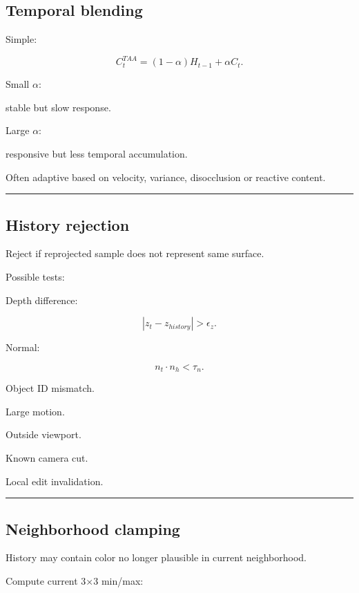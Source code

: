 \subsection{Temporal blending}\label{04-visual-computing-ii-ch040-temporal-blending}

Simple:

\[
\boxed{
C_t^{TAA}
=
(1-\alpha)
H_{t-1}
+
\alpha
C_t.
}
\]

Small \(\alpha\):

stable but slow response.

Large \(\alpha\):

responsive but less temporal accumulation.

Often adaptive based on velocity, variance, disocclusion or reactive content.

\begin{center}\rule{0.5\linewidth}{0.5pt}\end{center}

\subsection{History rejection}\label{04-visual-computing-ii-ch040-history-rejection}

Reject if reprojected sample does not represent same surface.

Possible tests:

Depth difference:

\[
|z_t-z_{history}|>\epsilon_z.
\]

Normal:

\[
n_t\cdot n_h<\tau_n.
\]

Object ID mismatch.

Large motion.

Outside viewport.

Known camera cut.

Local edit invalidation.

\begin{center}\rule{0.5\linewidth}{0.5pt}\end{center}

\subsection{Neighborhood clamping}\label{04-visual-computing-ii-ch040-neighborhood-clamping}

History may contain color no longer plausible in current neighborhood.

Compute current 3×3 min/max:

